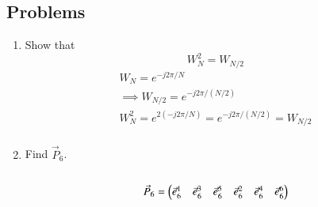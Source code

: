 \documentclass[journal,12pt,twocolumn]{IEEEtran}
\renewcommand\thesection{\arabic{section}}
\begin{document}
		\subsection{Problems}
		\begin{enumerate}[label=\arabic*.,ref=\thesection.\theenumi]
			\item Show that 
			\begin{equation}
				W_{N}^{2}=W_{N/2}
			\end{equation}
			\begin{align}
				W_{N} = e^{-j2\pi/N}\\
				\implies W_{N/2} = e^{-j2\pi/(N/2)}\\
				W_{N}^{2} = e^{2 (-j2\pi/N)} = e^{-j2\pi/(N/2)} = W_{N/2}\\
			\end{align}
			\item Find $\vec{P}_6$.\\
			\solution\\
			\begin{align}
				\vec{P}_{6} = \begin{pmatrix}\vec{e}_6^{1} &\vec{e}_6^{3} &\vec{e}_6^{5} &\vec{e}_6^{2}
					&\vec{e}_6^{4} &\vec{e}_6^{6}\end{pmatrix}
			\end{align}
			

\end{enumerate}
\end{document}
